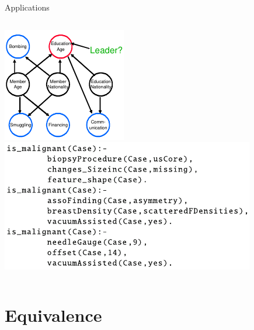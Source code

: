 \documentclass{beamer}
\begin{document}
\begin{frame}{Applications}
\begin{columns}
\begin{column}{0.5\textwidth}
      \includegraphics[width=\textwidth,height=0.4\textheight,keepaspectratio]{application_criminal.jpg}
      \\[-7pt]
      {\tiny \cite{DBLP:conf/sdm/DelaneyFCWJ10}}
      \vfill
      \null
      \includegraphics[width=\textwidth,height=0.5\textheight,keepaspectratio]{application_cancer.jpg}
      \\[-7pt]
      {\tiny \cite{DBLP:conf/ilp/Corte-RealD017}}
    \end{column}
  \end{columns}
\end{frame}

\section{Equivalence}
\end{document}
